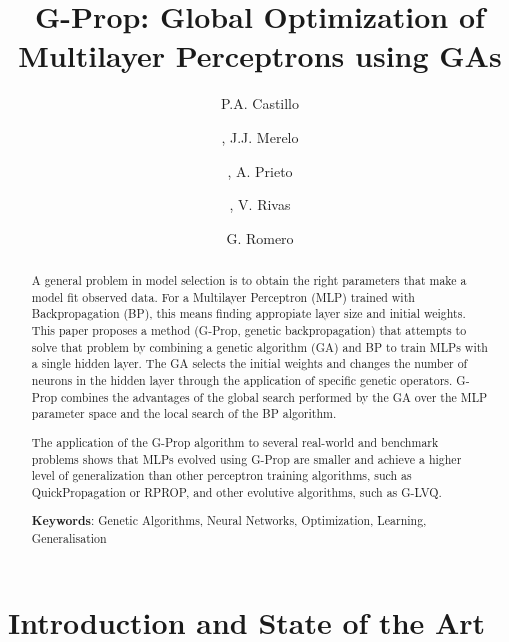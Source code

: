 \documentclass{elsart}
\begin{document}
\begin{frontmatter}
\title{G-Prop: Global Optimization of Multilayer Perceptrons using GAs}
\author[ugr]{P.A. Castillo}
\author[ugr]{, J.J. Merelo}
\author[ugr]{, A. Prieto}
\author[ujaen]{, V. Rivas}
\author[ugr]{G. Romero}

\address[ugr]{Departamento de Arquitectura y Tecnolog\'{\i}a de Computadoras,
           Facultad de Ciencias, Campus Fuentenueva, s/n, E. 18071,
           Universidad de Granada (Spain),
           {\tt todos@geneura.ugr.es, http://geneura.ugr.es}}
\address[ujaen]{Departamento de Inform\'{a}tica de la Universidad de Ja\'{e}n,
	Escuela Polit\'{e}cnica Superior, Universidad de Ja\'{e}n,
	Avda. Madrid, 35, E. 23071, Ja\'{e}n (Spain) }

 
\begin{abstract} 
A general problem in model selection is to obtain the right parameters that make a model fit observed data. For a Multilayer Perceptron (MLP) trained with Backpropagation (BP), this means finding appropiate layer size and initial weights.
This paper proposes a method (G-Prop, genetic backpropagation) that attempts to solve that problem by combining a genetic algorithm (GA) and BP to train MLPs with a single hidden layer. The GA selects the initial weights and changes the number of neurons in the hidden layer through the application of specific genetic operators. G-Prop combines the advantages of the global search performed by the GA over the MLP parameter space and the local search of the BP algorithm. 

The application of the G-Prop algorithm to several real-world and benchmark problems shows that MLPs evolved using G-Prop are smaller and achieve a higher level of generalization than other perceptron training algorithms, such as QuickPropagation or RPROP, and other evolutive algorithms, such as G-LVQ.

\textbf{Keywords}: Genetic Algorithms, Neural Networks, Optimization, Learning, Generalisation
\end{abstract} 

\end{frontmatter}
 

\section{Introduction and State of the Art}
\label{sec:intro}
\end{document}

